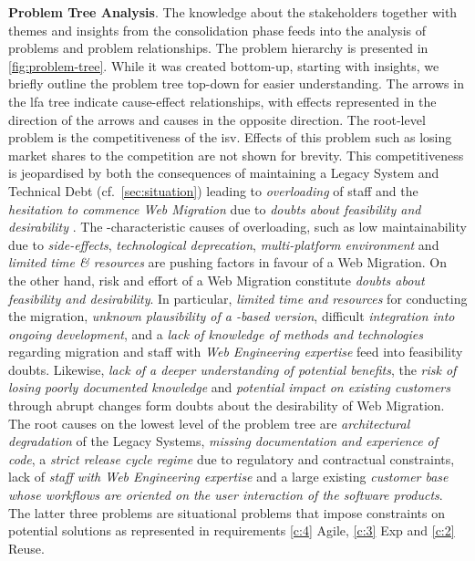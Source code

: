 \textbf{Problem Tree Analysis}.
The knowledge about the stakeholders together with themes and insights from the consolidation phase feeds into the analysis of problems and problem relationships.
The problem hierarchy is presented in \cref{fig:problem-tree}.
While it was created bottom-up, starting with insights, we briefly outline the problem tree top-down for easier understanding.
The arrows in the \gls{lfa} tree indicate cause-effect relationships, with effects represented in the direction of the arrows and causes in the opposite direction.
The root-level problem is the competitiveness of the \gls{isv}. Effects of this problem such as losing market shares to the competition are not shown for brevity.
This competitiveness is jeopardised by both the consequences of maintaining a \gls{Legacy System} and \gls{Technical Debt} (cf.~\cref{sec:situation}) leading to \emph{overloading} of staff and the \emph{hesitation to commence \gls{Web Migration}} due to \emph{doubts about feasibility and desirability} \autocite[cf.~also to resistance from organization in][]{Khadka2014ProfessionalsModernization,Sneed2010ReMiP}.
The -characteristic causes of overloading, such as low maintainability due to \emph{side-effects}, \emph{technological deprecation}, \emph{multi-platform environment} and \emph{limited time \& resources} are pushing factors in favour of a \gls{Web Migration}.
On the other hand, risk and effort of a \gls{Web Migration} constitute \emph{doubts about feasibility and desirability}.
In particular, \emph{limited time and resources} for conducting the migration, \emph{unknown plausibility of a -based version}, difficult \emph{integration into ongoing development}, and a \emph{lack of knowledge of methods and technologies} regarding migration and staff with \emph{\gls{Web Engineering} expertise} feed into feasibility doubts.
Likewise, \emph{lack of a deeper understanding of potential benefits}, the \emph{risk of losing poorly documented knowledge} and \emph{potential impact on existing customers} through abrupt changes form doubts about the desirability of \gls{Web Migration}.
The root causes on the lowest level of the problem tree are \emph{architectural degradation} of the \glspl{Legacy System}, \emph{missing documentation and experience of  code}, a \emph{strict release cycle regime} due to regulatory and contractual constraints, lack of \emph{staff with \gls{Web Engineering} expertise} and a large existing \emph{customer base whose workflows are oriented on the user interaction of the software products}.
The latter three problems are situational problems that impose constraints on potential solutions as represented in requirements \cref{c:4} Agile, \cref{c:3} Exp and \cref{c:2} Reuse.

